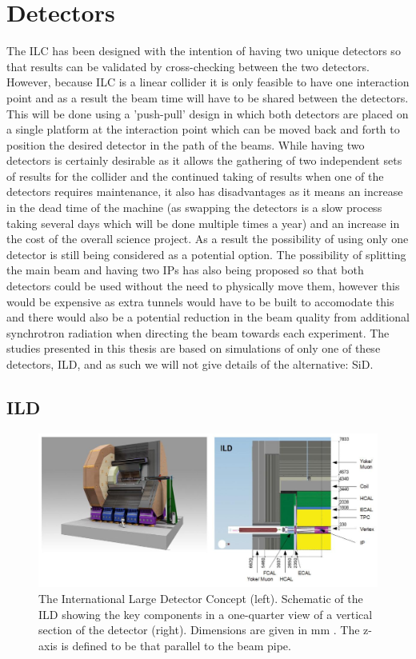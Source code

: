 \section{Detectors}
The \ac{ILC} has been designed with the intention of having two unique detectors so that results can be validated by cross-checking between the two detectors. However, because \ac{ILC} is a linear collider it is only feasible to have one interaction point and as a result the beam time will have to be shared between the detectors. This will be done using a 'push-pull' design in which both detectors are placed on a single platform at the interaction point which can be moved back and forth to position the desired detector in the path of the beams. While having two detectors is certainly desirable as it allows the gathering of two independent sets of results for the collider and the continued taking of results when one of the detectors requires maintenance, it also has disadvantages as it means an increase in the dead time of the machine (as swapping the detectors is a slow process taking several days which will be done multiple times a year) and an increase in the cost of the overall science project. As a result the possibility of using only one detector is still being considered as a potential option. The possibility of splitting the main beam and having two IPs has also being proposed so that both detectors could be used without the need to physically move them, however this would be expensive as extra tunnels would have to be built to accomodate this and there would also be a potential reduction in the beam quality from additional synchrotron radiation when directing the beam towards each experiment. The studies presented in this thesis are based on simulations of only one of these detectors, \ac{ILD}\cite{ILD}, and as such we will not give details of the alternative: \ac{SiD}\cite{Aihara:2009ad}. 

\subsection{ILD}
\begin{figure}
  \centering
  \includegraphics[width=1.0\textwidth,keepaspectratio]{Experiments/fig/ILD}
  \caption[ILD Detector]{The International Large Detector Concept (left). Schematic of the ILD showing the key components in a one-quarter view of a vertical section of the detector (right). Dimensions are given in mm \cite{Behnke:2013xla}. The z-axis is defined to be that parallel to the beam pipe.}
  \label{Fig:ILD}
\end{figure}

